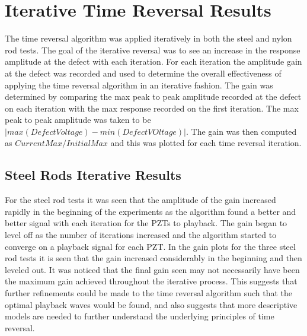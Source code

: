  \section{Iterative Time Reversal Results}
 The time reversal algorithm was applied iteratively in both the steel and nylon rod tests. The goal of the iterative reversal was to see an increase in the response amplitude at the defect with each iteration. For each iteration the amplitude gain at the defect was recorded and used to determine the overall effectiveness of applying the time  reversal algorithm in an iterative fashion. The gain was determined by comparing the max peak to peak amplitude recorded at the defect on each iteration with the max response recorded on the first iteration. The max peak to peak amplitude was taken to be $|max(DefectVoltage) - min(DefectVOltage)|$. The gain was then computed as $CurrentMax / InitialMax$ and this was plotted for each time reversal iteration. 
 
 \subsection{Steel Rods Iterative Results}
 For the steel rod tests it was seen that the amplitude of the gain increased rapidly in the beginning of the experiments as the algorithm found a better and better signal with each iteration for the PZTs to playback. The gain began to level off as the number of iterations increased and the algorithm started to converge on a playback signal for each PZT. In the gain plots for the three steel rod tests it is seen that the gain increased considerably in the beginning and then leveled out. It was noticed that the final gain seen may not necessarily have been the maximum gain achieved throughout the iterative process. This suggests that further refinements could be made to the time reversal algorithm such that the optimal playback waves would be found, and also suggests that more descriptive models are needed to further understand the underlying principles of time reversal.
 